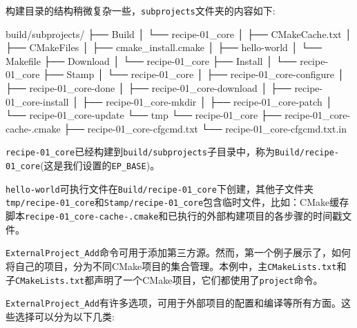 构建目录的结构稍微复杂一些，\texttt{subprojects}文件夹的内容如下:

\begin{codebox}[shell]
build/subprojects/
├── Build
│    └── recipe-01_core
│        ├── CMakeCache.txt
│        ├── CMakeFiles
│        ├── cmake_install.cmake
│        ├── hello-world
│        └── Makefile
├── Download
│    └── recipe-01_core
├── Install
│    └── recipe-01_core
├── Stamp
│    └── recipe-01_core
│        ├── recipe-01_core-configure
│        ├── recipe-01_core-done
│        ├── recipe-01_core-download
│        ├── recipe-01_core-install
│        ├── recipe-01_core-mkdir
│        ├── recipe-01_core-patch
│        └── recipe-01_core-update
└── tmp
    └── recipe-01_core
        ├── recipe-01_core-cache-.cmake
        ├── recipe-01_core-cfgcmd.txt
        └── recipe-01_core-cfgcmd.txt.in
\end{codebox}

\texttt{recipe-01\_core}已经构建到\texttt{build/subprojects}子目录中，称为\texttt{Build/recipe-01\_core}(这是我们设置的\texttt{EP\_BASE})。

\texttt{hello-world}可执行文件在\texttt{Build/recipe-01\_core}下创建，其他子文件夹\texttt{tmp/recipe-01\_core}和\texttt{Stamp/recipe-01\_core}包含临时文件，比如：CMake缓存脚本\texttt{recipe-01\_core-cache-.cmake}和已执行的外部构建项目的各步骤的时间戳文件。


\texttt{ExternalProject\_Add}命令可用于添加第三方源。然而，第一个例子展示了，如何将自己的项目，分为不同CMake项目的集合管理。本例中，主\texttt{CMakeLists.txt}和子\texttt{CMakeLists.txt}都声明了一个CMake项目，它们都使用了\texttt{project}命令。

\texttt{ExternalProject\_Add}有许多选项，可用于外部项目的配置和编译等所有方面。这些选择可以分为以下几类:

